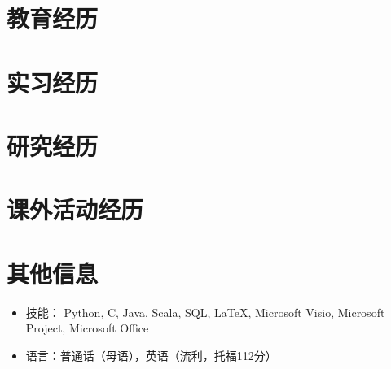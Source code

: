 \documentclass{resumeZH}
\begin{document}
\section{教育经历}

\thuundergrad
\umnexchange

\section{实习经历}

\continental
\summitview

\section{研究经历}

\fifaresearch

\section{课外活动经历}

\eydatascience
\cydp
\tkd
\semtech

\section{其他信息}

\vspace{0.618ex}
\begin{itemize}
\item 技能： Python, C, Java, Scala, SQL, {\LaTeX}, Microsoft Visio, Microsoft Project, Microsoft Office
\item 语言：普通话（母语），英语（流利，托福112分）
\end{itemize}
\end{document}
